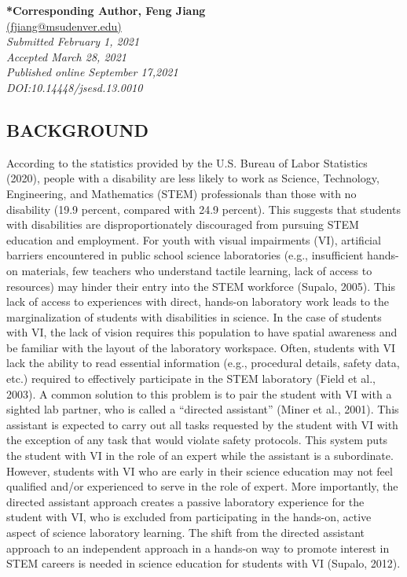 \documentclass[11.5pt]{sig-alternate} %
\begin{document}
\textbf{*Corresponding Author, Feng Jiang}\\
\href{mailto: fjiang@msudenver.edu }{(fjiang@msudenver.edu)} \\
\textit{Submitted  February 1, 2021}\\
\textit{Accepted March 28, 2021} \\
\textit{Published online September 17,2021} \\
\textit{DOI:10.14448/jsesd.13.0010} \\
\pagebreak
\clearpage
\begin{large}
\section*{BACKGROUND}

According to the statistics provided by the U.S. Bureau of Labor Statistics (2020), people with a disability are less likely to work as Science, Technology, Engineering, and Mathematics (STEM) professionals than those with no disability (19.9 percent, compared with 24.9 percent). This suggests that students with disabilities are disproportionately discouraged from pursuing STEM education and employment. For youth with visual impairments (VI), artificial barriers encountered in public school science laboratories (e.g., insufficient hands-on materials, few teachers who understand tactile learning, lack of access to resources) may hinder their entry into the STEM workforce (Supalo, 2005). This lack of access to experiences with direct, hands-on laboratory work leads to the marginalization of students with disabilities in science. In the case of students with VI, the lack of vision requires this population to have spatial awareness and be familiar with the layout of the laboratory workspace. Often, students with VI lack the ability to read essential information (e.g., procedural details, safety data, etc.) required to effectively participate in the STEM laboratory (Field et al., 2003). A common solution to this problem is to pair the student with VI with a sighted lab partner, who is called a “directed assistant” (Miner et al., 2001). This assistant is expected to carry out all tasks requested by the student with VI with the exception of any task that would violate safety protocols. This system puts the student with VI in the role of an expert while the assistant is a subordinate. However, students with VI who are early in their science education may not feel qualified and/or experienced to serve in the role of expert. More importantly, the directed assistant approach creates a passive laboratory experience for the student with VI, who is excluded from participating in the hands-on, active aspect of science laboratory learning. The shift from the directed assistant approach to an independent approach in a hands-on way to promote interest in STEM careers is needed in science education for students with VI (Supalo, 2012).


\end{large}
\end{document}
